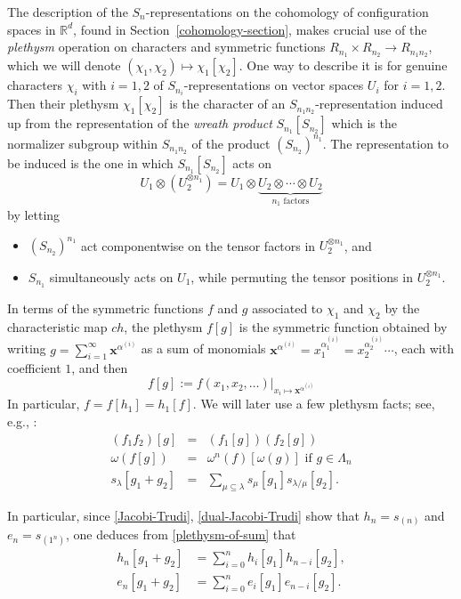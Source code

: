 \documentclass[12pt]{amsart}
\theoremstyle{plain}
\theoremstyle{definition}
\begin{document}
The description of the $S_n$-representations 
on the cohomology of configuration spaces in ${{\mathbb{R}}}^d$,
found in Section~\ref{cohomology-section}, 
makes crucial use of the {\it plethysm} operation on 
characters and symmetric functions
$R_{n_1} \times R_{n_2} \longrightarrow R_{n_1 n_2}$,
which we will denote $(\chi_1,\chi_2) \longmapsto \chi_1[\chi_2]$.
One way to describe it 
\cite[\S I.8]{Macdonald} is for genuine characters
$\chi_i$ with $i=1,2$ of $S_{n_i}$-representations on vector 
spaces $U_i$ for $i=1,2$.  Then their plethysm $\chi_1[\chi_2]$ is the
character of an $S_{n_1 n_2}$-representation induced up from the 
representation of the {\it wreath product} 
$S_{n_1}[S_{n_2}]$
which is the normalizer subgroup within $S_{n_1 n_2}$ of
the product $(S_{n_2})^{n_1}$.  The representation to be
induced is the one in which 
$S_{n_1}[S_{n_2}]$
acts on 
$$
U_1 \otimes \left( U_2 ^{\otimes n_1} \right)
=U_1 \otimes \underbrace{U_2 \otimes \cdots \otimes U_2}_{n_1\text{ factors}}
$$
by letting 
\begin{itemize}
\item $(S_{n_2})^{n_1}$ act componentwise on the tensor
factors in $U_2 ^{\otimes n_1}$, and
\item $S_{n_1}$ simultaneously acts on $U_1$, while permuting the
tensor positions in $U_2 ^{\otimes n_1}$.
\end{itemize}
In terms of  the symmetric functions $f$ and $g$ 
associated to $\chi_1$ and $\chi_2$ by  the characteristic map $ch$, 
the plethysm $f[g]$ is the symmetric function obtained by writing 
$g=\sum_{i=1}^\infty {{\mathbf{x}}}^{\alpha^{(i)}}$ as a sum of monomials 
${{\mathbf{x}}}^{\alpha^{(i)}}=x_1^{\alpha_1^{(i)}} =x_2^{\alpha_2^{(i)}} \cdots$, each with
coefficient $1$, and then 
$$
f[g]:=f(x_1,x_2,\ldots)|_{x_i \mapsto {{\mathbf{x}}}^{\alpha^{(i)}}}
$$
In particular, $f=f[h_1]=h_1 [f]$.
We will later use a few plethysm facts; see, e.g., 
\cite[\S I.8]{Macdonald}:
\begin{eqnarray}
\label{plethysm-is-ring-morphism}
(f_1f_2)[g] &=& (f_1[g])(f_2[g])\\
\label{omega-and-plethysm}
\omega \left( f[g] \right) &=& \omega^n(f) [ \omega(g) ] \text{ if }g \in \Lambda_n\\
\label{plethysm-of-sum}
s_{\lambda }[g_1+g_2] 
 &=& \sum_{\mu \subseteq \lambda  } s_{\mu } [g_1] s_{\lambda/\mu }[g_2].
\end{eqnarray}

\noindent
In particular, since \eqref{Jacobi-Trudi}, \eqref{dual-Jacobi-Trudi} show that
$h_n=s_{(n)}$ and $e_n=s_{(1^n)}$, one deduces from 
\eqref{plethysm-of-sum} that
\begin{eqnarray}
\label{h-plethysm}
h_n[g_1+g_2] &= \displaystyle \sum_{i=0}^n h_i [g_1] h_{n-i}[g_2],\\
\label{e-plethysm}
e_n[g_1+g_2] &= \displaystyle \sum_{i=0}^n e_i [g_1] e_{n-i}[g_2].
\end{eqnarray}
\end{document}

